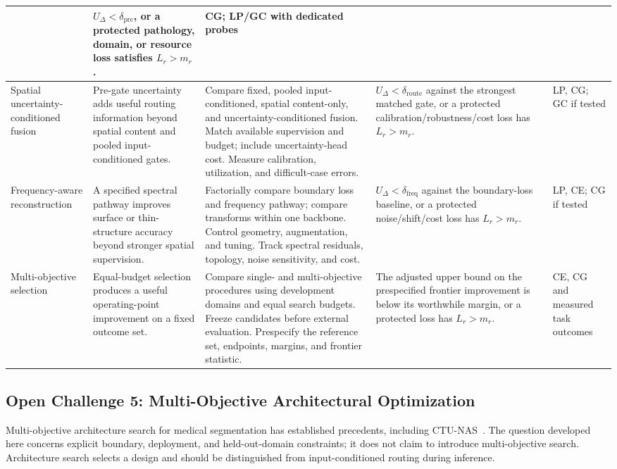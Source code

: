 \documentclass[5p,times,authoryear]{elsarticle}
\begin{document}
\begin{table}[!htbp]
\begin{tabular}{>{\raggedright\arraybackslash}p{2.35cm}>{\raggedright\arraybackslash}p{3.25cm}>{\raggedright\arraybackslash}p{5.05cm}>{\raggedright\arraybackslash}p{4.0cm}>{\raggedright\arraybackslash}p{1.5cm}}
& $U_\Delta<\delta_{\mathrm{pre}}$, or a protected pathology, domain, or resource loss satisfies $L_r>m_r$.
& CG; LP/GC with dedicated probes \\
\midrule
Spatial uncertainty-conditioned fusion
& Pre-gate uncertainty adds useful routing information beyond spatial content and pooled input-conditioned gates.
& Compare fixed, pooled input-conditioned, spatial content-only, and uncertainty-conditioned fusion. Match available supervision and budget; include uncertainty-head cost. Measure calibration, utilization, and difficult-case errors.
& $U_\Delta<\delta_{\mathrm{route}}$ against the strongest matched gate, or a protected calibration/robustness/cost loss has $L_r>m_r$.
& LP, CG; GC if tested \\
\midrule
Frequency-aware reconstruction
& A specified spectral pathway improves surface or thin-structure accuracy beyond stronger spatial supervision.
& Factorially compare boundary loss and frequency pathway; compare transforms within one backbone. Control geometry, augmentation, and tuning. Track spectral residuals, topology, noise sensitivity, and cost.
& $U_\Delta<\delta_{\mathrm{freq}}$ against the boundary-loss baseline, or a protected noise/shift/cost loss has $L_r>m_r$.
& LP, CE; CG if tested \\
\midrule
Multi-objective selection
& Equal-budget selection produces a useful operating-point improvement on a fixed outcome set.
& Compare single- and multi-objective procedures using development domains and equal search budgets. Freeze candidates before external evaluation. Prespecify the reference set, endpoints, margins, and frontier statistic.
& The adjusted upper bound on the prespecified frontier improvement is below its worthwhile margin, or a protected loss has $L_r>m_r$.
& CE, CG and measured task outcomes \\
\bottomrule
\end{tabular}
\end{table}

\subsection{Open Challenge 5: Multi-Objective Architectural Optimization}
\label{subsec:moo}

Multi-objective architecture search for medical segmentation has established precedents, including CTU-NAS~\citep{ying2023ctunas_verified}. The question developed here concerns explicit boundary, deployment, and held-out-domain constraints; it does not claim to introduce multi-objective search. Architecture search selects a design and should be distinguished from input-conditioned routing during inference.
\end{document}
